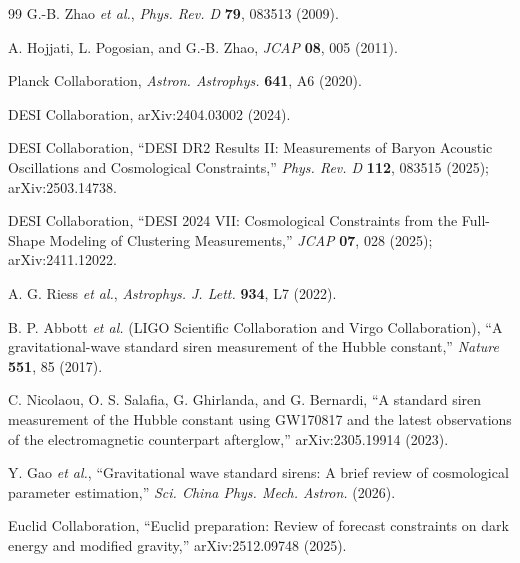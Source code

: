 \documentclass[aps,prd,twocolumn,superscriptaddress,nofootinbib]{revtex4-2}
\begin{document}
\begin{thebibliography}{99}
G.-B. Zhao \textit{et al.},
\textit{Phys. Rev. D} \textbf{79}, 083513 (2009).

A. Hojjati, L. Pogosian, and G.-B. Zhao,
\textit{JCAP} \textbf{08}, 005 (2011).

Planck Collaboration,
\textit{Astron. Astrophys.} \textbf{641}, A6 (2020).

DESI Collaboration,
arXiv:2404.03002 (2024).

DESI Collaboration,
``DESI DR2 Results II: Measurements of Baryon Acoustic Oscillations and Cosmological Constraints,''
\textit{Phys. Rev. D} \textbf{112}, 083515 (2025); arXiv:2503.14738.

DESI Collaboration,
``DESI 2024 VII: Cosmological Constraints from the Full-Shape Modeling of Clustering Measurements,''
\textit{JCAP} \textbf{07}, 028 (2025); arXiv:2411.12022.

A. G. Riess \textit{et al.},
\textit{Astrophys. J. Lett.} \textbf{934}, L7 (2022).

B. P. Abbott \textit{et al.} (LIGO Scientific Collaboration and Virgo Collaboration),
``A gravitational-wave standard siren measurement of the Hubble constant,''
\textit{Nature} \textbf{551}, 85 (2017).

C. Nicolaou, O. S. Salafia, G. Ghirlanda, and G. Bernardi,
``A standard siren measurement of the Hubble constant using GW170817 and the latest observations of the electromagnetic counterpart afterglow,''
arXiv:2305.19914 (2023).

Y. Gao \textit{et al.},
``Gravitational wave standard sirens: A brief review of cosmological parameter estimation,''
\textit{Sci. China Phys. Mech. Astron.} (2026).

Euclid Collaboration,
``Euclid preparation: Review of forecast constraints on dark energy and modified gravity,''
arXiv:2512.09748 (2025).

\end{thebibliography}
\end{document}
